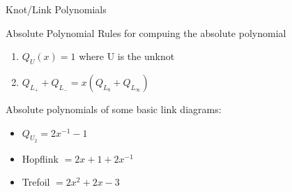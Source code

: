 \documentclass[12pt, letterpaper]{article}
\begin{document}
\begin{section}{Knot/Link Polynomials}
\begin{subsection}{Absolute Polynomial}
    Rules for compuing the absolute polynomial
    \begin{enumerate}
      \item \(Q_{U}(x) = 1\) where U is the unknot
      \item \(Q_{L_{+}} + Q_{L_{-}} = x(Q_{L_{0}} + Q_{L_{\infty}})\)
    \end{enumerate}

    Absolute polynomials of some basic link diagrams:
    \begin{itemize}
      \item \(Q_{U_{2}} = 2x^{-1} - 1\)
      \item Hopflink \(= 2x + 1 + 2x^{-1}\)
      \item Trefoil \(= 2x^{2} + 2x - 3\)
    \end{itemize}
  \end{subsection}

\end{section}
\end{document}
